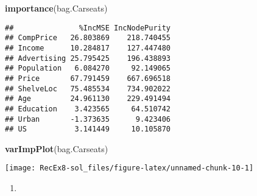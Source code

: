 \documentclass[
]{article}
\newenvironment{Shaded}{\begin{snugshade}}{\end{snugshade}}
\newcommand{\AttributeTok}[1]{\textcolor[rgb]{0.13,0.29,0.53}{#1}}
\newcommand{\ConstantTok}[1]{\textcolor[rgb]{0.56,0.35,0.01}{#1}}
\newcommand{\DecValTok}[1]{\textcolor[rgb]{0.00,0.00,0.81}{#1}}
\newcommand{\FunctionTok}[1]{\textcolor[rgb]{0.13,0.29,0.53}{\textbf{#1}}}
\newcommand{\NormalTok}[1]{#1}
\newcommand{\OtherTok}[1]{\textcolor[rgb]{0.56,0.35,0.01}{#1}}
\newcommand{\SpecialCharTok}[1]{\textcolor[rgb]{0.81,0.36,0.00}{\textbf{#1}}}
\providecommand{\tightlist}{%
  \setlength{\itemsep}{0pt}\setlength{\parskip}{0pt}}
\begin{document}
\begin{Shaded}
\begin{Highlighting}[]
\FunctionTok{importance}\NormalTok{(bag.Carseats)}
\end{Highlighting}
\end{Shaded}

\begin{verbatim}
##               %IncMSE IncNodePurity
## CompPrice   26.803869    218.740455
## Income      10.284817    127.447480
## Advertising 25.795425    196.438893
## Population   6.084270     92.149065
## Price       67.791459    667.696518
## ShelveLoc   75.485534    734.902022
## Age         24.961130    229.491494
## Education    3.423565     64.510742
## Urban       -1.373635      9.423406
## US           3.141449     10.105870
\end{verbatim}

\begin{Shaded}
\begin{Highlighting}[]
\FunctionTok{varImpPlot}\NormalTok{(bag.Carseats)}
\end{Highlighting}
\end{Shaded}

\texttt{[image: RecEx8-sol\_files/figure-latex/unnamed-chunk-10-1]}

\begin{enumerate}
\def\labelenumi{\alph{enumi})}
\setcounter{enumi}{4}
\tightlist
\item
\end{enumerate}

\begin{Shaded}
\end{Shaded}
\end{document}
